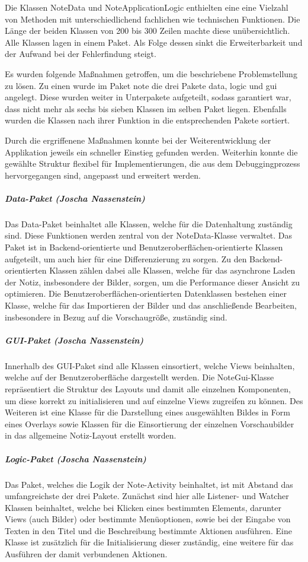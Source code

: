 Die Klassen NoteData und NoteApplicationLogic enthielten eine eine Vielzahl von Methoden mit unterschiedlichend fachlichen wie technischen Funktionen. Die Länge der beiden Klassen von 200 bis 300 Zeilen machte diese unübersichtlich. Alle Klassen lagen in einem Paket. Als Folge dessen sinkt die Erweiterbarkeit und der Aufwand bei der Fehlerfindung steigt.

Es wurden folgende Maßnahmen getroffen, um die beschriebene Problemstellung zu lösen. Zu einen wurde im Paket note die drei Pakete data, logic und gui angelegt. Diese wurden weiter in Unterpakete aufgeteilt, sodass garantiert war, dass nicht mehr als sechs bis sieben Klassen im selben Paket liegen. Ebenfalls wurden die Klassen nach ihrer Funktion in die entsprechenden Pakete sortiert.

Durch die ergriffenene Maßnahmen konnte bei der Weiterentwicklung der Applikation jeweils ein schneller Einstieg gefunden werden. Weiterhin konnte die gewählte Struktur flexibel für Implementierungen, die aus dem Debuggingprozess hervorgegangen sind, angepasst und erweitert werden.

\subparagraph{Data-Paket (Joscha Nassenstein)}
Das Data-Paket beinhaltet alle Klassen, welche für die Datenhaltung zuständig sind. Diese Funktionen werden zentral von der NoteData-Klasse verwaltet. Das Paket ist in Backend-orientierte und Benutzeroberflächen-orientierte Klassen aufgeteilt, um auch hier für eine Differenzierung zu sorgen. Zu den Backend-orientierten Klassen zählen dabei alle Klassen, welche für das asynchrone Laden der Notiz, insbesondere der Bilder, sorgen, um die Performance dieser Ansicht zu optimieren. Die Benutzeroberflächen-orientierten Datenklassen bestehen einer Klasse, welche für das Importieren der Bilder und das anschließende Bearbeiten, insbesondere in Bezug auf die Vorschaugröße, zuständig sind.

\subparagraph{GUI-Paket (Joscha Nassenstein)}
Innerhalb des GUI-Paket sind alle Klassen einsortiert, welche Views beinhalten, welche auf der Benutzeroberfläche dargestellt werden. Die NoteGui-Klasse repräsentiert die Struktur des Layouts und damit alle einzelnen Komponenten, um diese korrekt zu initialisieren und auf einzelne Views zugreifen zu können. Des Weiteren ist eine Klasse für die Darstellung eines ausgewählten Bildes in Form eines Overlays sowie Klassen für die Einsortierung der einzelnen Vorschaubilder in das allgemeine Notiz-Layout erstellt worden.

\subparagraph{Logic-Paket (Joscha Nassenstein)}
Das Paket, welches die Logik der Note-Activity beinhaltet, ist mit Abstand das umfangreichste der drei Pakete. Zunächst sind hier alle Listener- und Watcher Klassen beinhaltet, welche bei Klicken eines bestimmten Elements, darunter Views (auch Bilder) oder bestimmte Menüoptionen, sowie bei der Eingabe von Texten in den Titel und die Beschreibung bestimmte Aktionen ausführen. Eine Klasse ist zusätzlich für die Initialisierung dieser zuständig, eine weitere für das Ausführen der damit verbundenen Aktionen.

